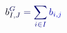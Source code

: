\documentclass[12pt]{article}
\begin{document}
\makeatletter
\renewcommand*{\@textcolor}[3]{%
  \protect\leavevmode
  \begingroup
    \color#1{#2}#3%
  \endgroup
}
\makeatother
\begin{displaymath}
\mathcolor[RGB]{0,0,15}{b} _ { \mathcolor[RGB]{0,0,30}{I} \mathcolor[RGB]{0,0,45}{,} \mathcolor[RGB]{0,0,60}{J} } ^ { \mathcolor[RGB]{0,0,75}{G} } \mathcolor[RGB]{0,0,90}{=} \mathcolor[RGB]{0,0,105}{\sum} _ { \mathcolor[RGB]{0,0,120}{i} \mathcolor[RGB]{0,0,135}{\in} \mathcolor[RGB]{0,0,150}{I} } \mathcolor[RGB]{0,0,165}{b} _ { \mathcolor[RGB]{0,0,180}{i} \mathcolor[RGB]{0,0,195}{,} \mathcolor[RGB]{0,0,210}{j} }
\end{displaymath}
\end{document}
